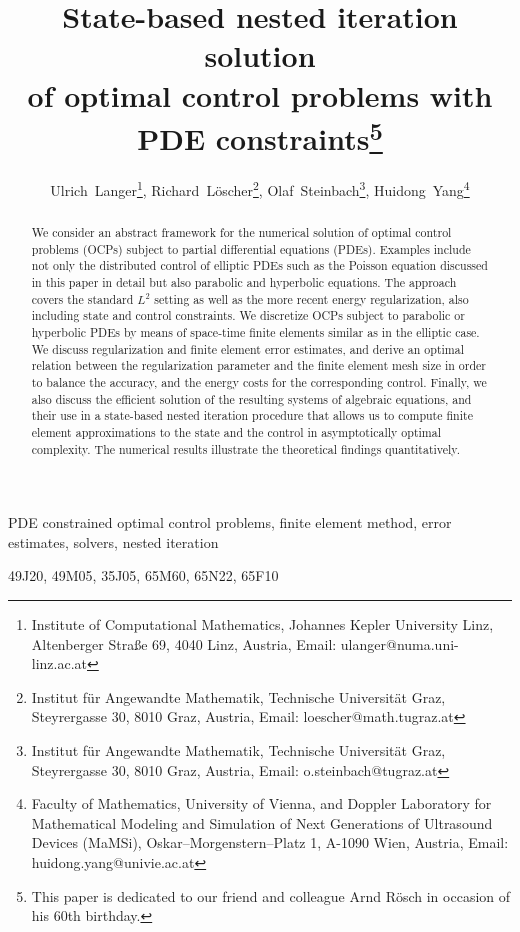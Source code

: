 \documentclass{article}
\title{State-based nested iteration solution \\ 
         of optimal control problems with PDE constraints\footnote{This paper
           is dedicated to our friend and colleague Arnd R\"osch in
         occasion of his 60th birthday.}}
\author{Ulrich~Langer\footnote{Institute of Computational Mathematics,
    Johannes Kepler University Linz, Altenberger Stra{\ss}e 69, 4040 Linz,
    Austria, Email: ulanger@numa.uni-linz.ac.at},
  \;
  Richard~L\"oscher\footnote{Institut f\"{u}r Angewandte Mathematik,
    Technische Universit\"{a}t Graz, Steyrergasse 30, 8010 Graz, Austria,
    Email: loescher@math.tugraz.at}, 
  \; Olaf~Steinbach\footnote{Institut f\"{u}r Angewandte Mathematik,
    Technische Universit\"{a}t Graz, Steyrergasse 30, 8010 Graz, Austria,
    Email: o.steinbach@tugraz.at}, 
  \; Huidong~Yang\footnote{Faculty of Mathematics, University of Vienna,
  and 
  Doppler Laboratory for Mathematical Modeling and Simulation of Next
  Generations of Ultrasound Devices (MaMSi),
  Oskar--Morgenstern--Platz 1, A-1090 Wien, Austria, Email: huidong.yang@univie.ac.at}
}
\date{}
\numberwithin{equation}{section}
\begin{document}
\maketitle

\begin{abstract}
  We consider an abstract framework for the numerical solution of optimal
  control problems (OCPs) subject to partial differential equations (PDEs). 
  Examples include not only the distributed control of elliptic PDEs such
  as the Poisson equation discussed in this paper in detail but also
  parabolic and hyperbolic equations. The approach covers the standard
  $L^2$ setting as well as the more recent energy regularization, also
  including state and control constraints. We discretize OCPs subject to
  parabolic or hyperbolic PDEs by means of space-time finite elements
  similar as in the elliptic case. We discuss regularization and finite
  element error estimates, and derive an optimal relation between the
  regularization parameter and the finite element mesh size in order to
  balance the accuracy, and the energy costs for the corresponding control.
  Finally, we also discuss the efficient solution of the resulting systems
  of algebraic equations, and their use in a state-based nested iteration
  procedure that allows us to compute finite element approximations to the
  state and the control in asymptotically optimal complexity.
  The numerical results illustrate the theoretical findings quantitatively.
\end{abstract} 

\noindent
\begin{keywords} 
PDE constrained optimal control problems, 
finite element method, 
error estimates, solvers, nested iteration
\end{keywords}

\medskip

\noindent
\begin{msc}
49J20,  %
49M05,  %
35J05,  %
65M60,  %
65N22,   %
65F10 %
\end{msc}
\end{document}
